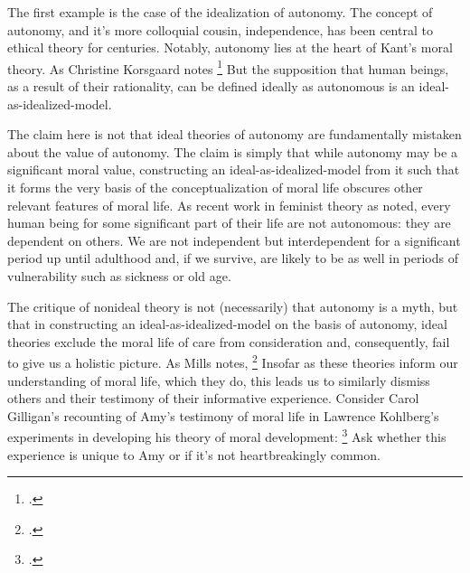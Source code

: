 \documentclass[letterpaper,notitlepage,12pt]{article}
\begin{document}
The first example is the case of the idealization of autonomy.
The concept of autonomy, and it's more colloquial cousin, independence, has been
central to ethical theory for centuries.
Notably, autonomy lies at the heart of Kant's moral theory.
As Christine Korsgaard notes \footcite[p. 23]{korsgaard_creating_1996}
But the supposition that human beings, as a result of their rationality, can be
defined ideally as autonomous is an ideal-as-idealized-model.

The claim here is not that ideal theories of autonomy are fundamentally mistaken
about the value of autonomy.
The claim is simply that while autonomy may be a significant moral value,
constructing an ideal-as-idealized-model from it such that it forms the very
basis of the conceptualization of moral life obscures other relevant features of
moral life.
As recent work in feminist theory as noted, every human being for some
significant part of their life are not autonomous: they are dependent on others.
We are not independent but interdependent for a significant period up until
adulthood and, if we survive, are likely to be as well in periods of
vulnerability such as sickness or old age.

The critique of nonideal theory is not (necessarily) that autonomy is a myth, 
but that in constructing an ideal-as-idealized-model on the basis of autonomy,
ideal theories exclude the moral life of care from consideration and,
consequently, fail to give us a holistic picture.
As Mills notes, \footcite[p.
177]{mills_ideal_2005}
Insofar as these theories inform our understanding of moral life, which they do,
this leads us to similarly dismiss others and their testimony of their
informative experience.
Consider Carol Gilligan's recounting of Amy's testimony of moral life in
Lawrence Kohlberg's experiments in developing his theory of moral development:
\footcite[p.
29]{gilligan_different_1993}
Ask whether this experience is unique to Amy or if it's not heartbreakingly
common.
\end{document}
